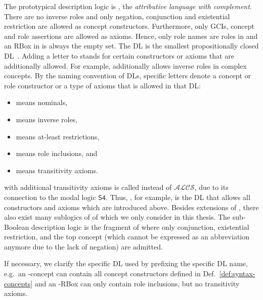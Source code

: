 The prototypical description logic is \ALC, the \emph{attributive language with complement}. There
are no inverse roles and only negation, conjunction and existential restriction are allowed as
concept constructors. Furthermore, only GCIs, concept and role assertions are allowed as
axioms. Hence, only role names are roles in \ALC and an RBox in \ALC is always the empty set.  The
DL \ALC is the smallest propositionally closed DL~\cite{ScSm-AIJ91}.
%
Adding a letter to \ALC stands for certain constructors or axioms that are additionally allowed. For
example, \ALCI additionally allows inverse roles in complex concepts.  By the naming convention of
DLs, specific letters denote a concept or role constructor or a type of axioms that is allowed in
that DL:
\begin{itemize}
\item \Omc means nominals,
\item \Imc means inverse roles,
\item \Qmc means at-least restrictions,
\item \Hmc means role inclusions, and
\item \Smc means transitivity axioms.
\end{itemize}
%
\ALC with additional transitivity axioms is called \Smc instead of $\mathcal{ALCS}$, due to its
connection to the modal logic $\mathsf{S4}$. Thus, \SHOIQ, for example, is the DL that allows all
constructors and axioms which are introduced above. Besides extensions of \ALC, there also exist many
sublogics of \ALC of which we only consider \EL in this thesis. The sub-Boolean description logic
\EL is the fragment of \ALC where only conjunction, existential restriction, and the top concept
(which cannot be expressed as an abbreviation anymore due to the lack of negation) are
admitted.

If necessary, we clarify the specific DL used by prefixing the specific DL name, e.g.\ an
\ALCOIQ-concept can contain all concept constructors defined in Def.~\ref{def:syntax-concepts} and
an \ALCH-RBox can only contain role inclusions, but no transitivity axioms.

